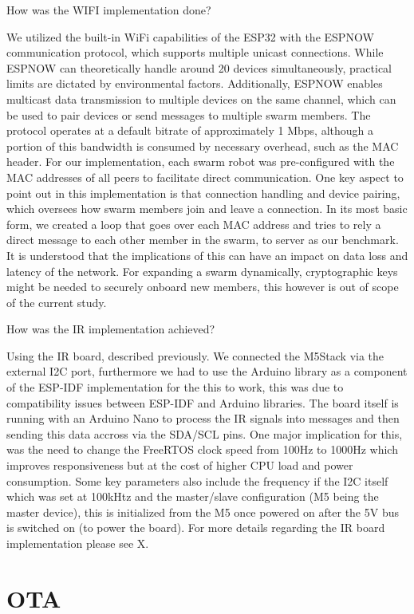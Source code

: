 \documentclass{report}
\begin{document}
How was the WIFI implementation done?

We utilized the built-in WiFi capabilities of the ESP32 with the ESPNOW communication protocol, which supports multiple unicast connections. While ESPNOW can theoretically handle around 20 devices simultaneously, practical limits are dictated by environmental factors. Additionally, ESPNOW enables multicast data transmission to multiple devices on the same channel, which can be used to pair devices or send messages to multiple swarm members. The protocol operates at a default bitrate of approximately 1 Mbps, although a portion of this bandwidth is consumed by necessary overhead, such as the MAC header. For our implementation, each swarm robot was pre-configured with the MAC addresses of all peers to facilitate direct communication. %
One key aspect to point out in this implementation is that connection handling and device pairing, which oversees how swarm members join and leave a connection. In its most basic form, we created a loop that goes over each MAC address and tries to rely a direct message to each other member in the swarm, to server as our benchmark. It is understood that the implications of this can have an impact on data loss and latency of the network.
For expanding a swarm dynamically, cryptographic keys might be needed to securely onboard new members, this however is out of scope of the current study.

How was the IR implementation achieved?

Using the IR board, described previously. We connected the M5Stack via the external I2C port, furthermore we had to use the Arduino library as a component of the ESP-IDF implementation for the this to work, this was due to compatibility issues between ESP-IDF and Arduino libraries. The board itself is running with an Arduino Nano to process the IR signals into messages and then sending this data accross via the SDA/SCL pins. One major implication for this, was the need to change the FreeRTOS clock speed from 100Hz to 1000Hz which improves responsiveness but at the cost of higher CPU load and power consumption. Some key parameters also include the frequency if the I2C itself which was set at 100kHtz and the master/slave configuration (M5 being the master device), this is initialized from the M5 once powered on after the 5V bus is switched on (to power the board). For more details regarding the IR board implementation please see X. 

\section{OTA}
\end{document}
